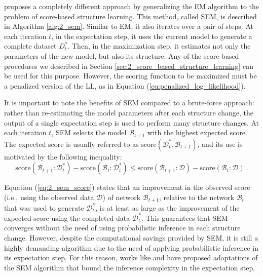 \cite{friedman1997_sem} proposes a completely different approach by generalizing the EM algorithm to the problem of score-based structure learning. This method, called SEM, is described in Algorithm \ref{alg:2_sem}. Similar to EM, it also iterates over a pair of steps. At each iteration $t$, in the expectation step, it uses the current model to generate a complete dataset $D^{*}_{t}$. Then, in the maximization step, it estimates not only the parameters of the new model, but also its structure. Any of the score-based procedures we described in Section \ref{sec:2_score_based_structure_learning} can be used for this purpose. However, the scoring function to be maximized must be a penalized version of the LL, as in Equation (\ref{eq:penalized_log_likelihood}). 

It is important to note the benefits of SEM compared to a brute-force approach: rather than re-estimating the model parameters after each structure change, the output of a single expectation step is used to perform many structure changes. At each iteration $t$, SEM selects the model $\mathcal{B}_{t+1}$ with the highest expected score. The expected score is usually referred to as $\text{score}(\mathcal{D}^{*}_{t}, \mathcal{B}_{t+1})$, and its use is motivated by the following inequality:
\begin{equation} \label{eq:2_sem_score}
\text{score}(\mathcal{B}_{t+1} : \mathcal{D}^{*}_{t}) - \text{score}(\mathcal{B}_{t} : \mathcal{D}^{*}_{t}) \leq \text{score}(\mathcal{B}_{t+1} : \mathcal{D}) - \text{score}(\mathcal{B}_{t} : \mathcal{D}) \ .
\end{equation}

Equation (\ref{eq:2_sem_score}) states that an improvement in the observed score (i.e., using the observed data $\mathcal{D}$) of network $\mathcal{B}_{t+1}$, relative to the network $\mathcal{B}_{t}$ that was used to generate $ \mathcal{D}^{*}_{t}$, is at least as large as the improvement of the expected score using the completed data $\mathcal{D}^{*}_{t}$. This guarantees that SEM converges  without the need of using probabilistic inference in each structure change. However, despite the computational savings provided by SEM, it is still a highly demanding algorithm due to the need of applying probabilistic inference in its expectation step. For this reason, works like \cite{scangatta2018} and \cite{benjumeda2019} have proposed adaptations of the SEM algorithm that bound the inference complexity in the expectation step.




